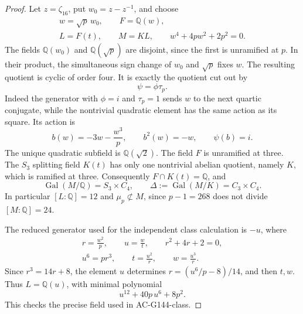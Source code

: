 \begin{proof}
Let $z=\zeta_{16}$, put $w_0=z-z^{-1}$, and choose
\[
 \begin{gathered}
 w=\sqrt p\,w_0,\qquad F=\mathbb Q(w),\\
 L=F(t),\qquad M=KL,\qquad
 w^4+4p w^2+2p^2=0 .
 \end{gathered}
 \tag{C16T.7}
\]
The fields $\mathbb Q(w_0)$ and $\mathbb Q(\sqrt p)$ are disjoint,
since the first is unramified at $p$.
In their product, the simultaneous sign change of $w_0$ and
$\sqrt p$ fixes $w$.  The resulting quotient is cyclic of order four.
It is exactly the quotient cut out by
\[
                         \psi=\phi\tau_p.
 \tag{C16T.8}
\]
Indeed the generator with $\phi=i$ and $\tau_p=1$ sends
$w$ to the next quartic conjugate, while the nontrivial quadratic
element has the same action as its square.  Its action is
\[
 b(w)=-3w-\frac{w^3}{p},\qquad b^2(w)=-w,\qquad \psi(b)=i .
 \tag{C16T.9}
\]
The unique quadratic subfield is $\mathbb Q(\sqrt2)$.
The field $F$ is unramified at three.
The $S_3$ splitting field $K(t)$ has only one nontrivial abelian
quotient, namely $K$, which is ramified at three.
Consequently $F\cap K(t)=\mathbb Q$, and
\[
 \operatorname{Gal}(M/\mathbb Q)=S_3\times C_4,\qquad
 \Delta:=\operatorname{Gal}(M/K)=C_3\times C_4.
 \tag{C16T.10}
\]
In particular $[L:\mathbb Q]=12$ and $\mu_p\not\subset M$,
since $p-1=268$ does not divide $[M:\mathbb Q]=24$.

The reduced generator used for the independent class calculation
is $-u$, where
\[
 \begin{gathered}
 r=\frac{w^2}{p},\qquad u=\frac wt,\qquad r^2+4r+2=0,\\
 u^6=p r^3,\qquad t=\frac{u^2}{r},\qquad w=\frac{u^3}{r}.
 \end{gathered}
 \tag{C16T.11}
\]
Since $r^3=14r+8$, the element $u$ determines
$r=(u^6/p-8)/14$, and then $t,w$.
Thus $L=\mathbb Q(u)$, with minimal polynomial
\[
                    u^{12}+40p\,u^6+8p^2.
 \tag{C16T.12}
\]
This checks the precise field used in AC-G144-class.


\end{proof}
